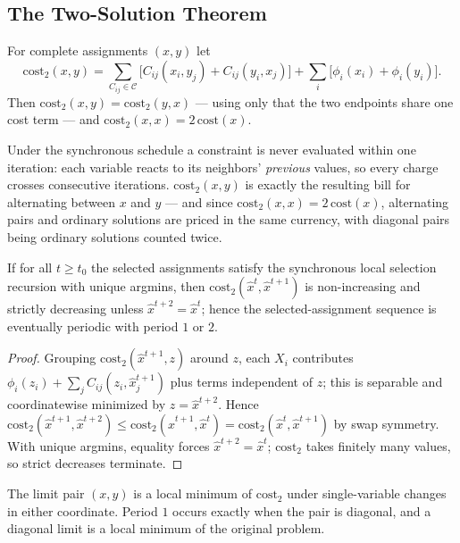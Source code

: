 \subsection{The Two-Solution Theorem}\label{sec:twosol}

\begin{definition}\label{def:altcost}
For complete assignments $(x, y)$ let
\[
  \mathrm{cost}_2(x,y) = \!\!\sum_{C_{ij}\in\mathcal{C}}\!\!
  \big[C_{ij}(x_i, y_j) + C_{ij}(y_i, x_j)\big]
  + \sum_i \big[\phi_i(x_i) + \phi_i(y_i)\big].
\]
Then $\mathrm{cost}_2(x,y) = \mathrm{cost}_2(y,x)$ --- using only that
the two endpoints share one cost term --- and $\mathrm{cost}_2(x,x) =
2\,\mathrm{cost}(x)$.
\end{definition}

Under the synchronous schedule a constraint is never evaluated within one
iteration: each variable reacts to its neighbors' \emph{previous} values,
so every charge crosses consecutive iterations.  $\mathrm{cost}_2(x,y)$ is
exactly the resulting bill for alternating between $x$ and $y$ --- and
since $\mathrm{cost}_2(x,x) = 2\,\mathrm{cost}(x)$, alternating pairs and
ordinary solutions are priced in the same currency, with diagonal pairs
being ordinary solutions counted twice.

\begin{theorem}\label{thm:tworoutes}
If for all $t \ge t_0$ the selected assignments satisfy the synchronous
local selection recursion with unique argmins, then
$\mathrm{cost}_2(\hat{x}^{t}, \hat{x}^{t+1})$ is non-increasing and
strictly decreasing unless $\hat{x}^{t+2} = \hat{x}^{t}$; hence the
selected-assignment sequence is eventually periodic with period $1$ or
$2$.
\end{theorem}
\begin{proof}
Grouping $\mathrm{cost}_2(\hat{x}^{t+1}, z)$ around $z$, each $X_i$
contributes $\phi_i(z_i) + \sum_{j} C_{ij}(z_i, \hat{x}^{t+1}_j)$ plus
terms independent of $z$; this is separable and coordinatewise minimized
by $z = \hat{x}^{t+2}$.  Hence
$\mathrm{cost}_2(\hat{x}^{t+1}, \hat{x}^{t+2}) \le
\mathrm{cost}_2(\hat{x}^{t+1}, \hat{x}^{t}) =
\mathrm{cost}_2(\hat{x}^{t}, \hat{x}^{t+1})$ by swap symmetry.  With
unique argmins, equality forces $\hat{x}^{t+2} = \hat{x}^{t}$;
$\mathrm{cost}_2$ takes finitely many values, so strict decreases
terminate. \qedhere
\end{proof}

\begin{corollary}\label{cor:localmin}
The limit pair $(x, y)$ is a local minimum of $\mathrm{cost}_2$ under
single-variable changes in either coordinate.  Period $1$ occurs exactly
when the pair is diagonal, and a diagonal limit is a local minimum of the
original problem.
\end{corollary}


